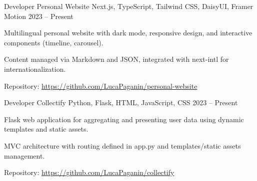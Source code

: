 \begin{cventries}

\cventry
{Developer} %
{Personal Website} %
{Next.js, TypeScript, Tailwind CSS, DaisyUI, Framer Motion} %
{2023 -- Present} %
{ %
\begin{cvitems}
  \item {Multilingual personal website with dark mode, responsive design, and interactive components (timeline, carousel).}
  \item {Content managed via Markdown and JSON, integrated with next-intl for internationalization.}
  \item {Repository: \url{https://github.com/LucaPaganin/personal-website}}  
\end{cvitems}
}


\cventry
{Developer} %
{Collectify} %
{Python, Flask, HTML, JavaScript, CSS} %
{2023 -- Present} %
{ %
\begin{cvitems}
  \item {Flask web application for aggregating and presenting user data using dynamic templates and static assets.}
  \item {MVC architecture with routing defined in app.py and templates/static assets management.}
  \item {Repository: \url{https://github.com/LucaPaganin/collectify}}  
\end{cvitems}
}


\end{cventries}
